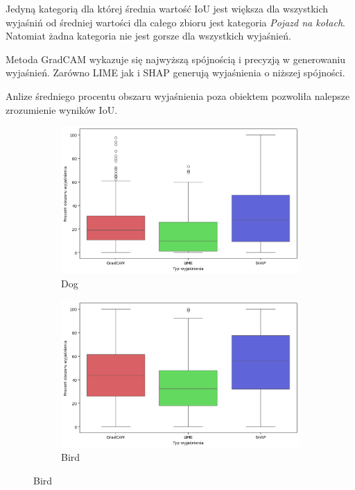 Jedyną kategorią dla której średnia wartość IoU jest większa dla wszystkich wyjaśniń od średniej wartości dla całego zbioru jest kategoria \textit{Pojazd na kołach}.
Natomiat żadna kategoria nie jest gorsze dla wszystkich wyjaśnień.

Metoda GradCAM wykazuje się najwyższą spójnością i precyzją w generowaniu wyjaśnień.
Zarówno LIME jak i SHAP generują wyjaśnienia o niższej spójności.

\vspace{1cm}

Anlize średniego procentu obszaru wyjaśnienia poza obiektem pozwoliła nalepsze zrozumienie wyników IoU.

\begin{figure}[h]
	\centering
	\begin{subfigure}[b]{0.3\textwidth}
		\centering\includegraphics[width=.9\textwidth]{img/areaincorrect_dog}
		\caption{Dog}
	\end{subfigure}
	\begin{subfigure}[b]{0.3\textwidth}
		\centering\includegraphics[width=.9\textwidth]{img/areaincorrect_bird}
		\caption{Bird}
	\end{subfigure}

\end{figure}

